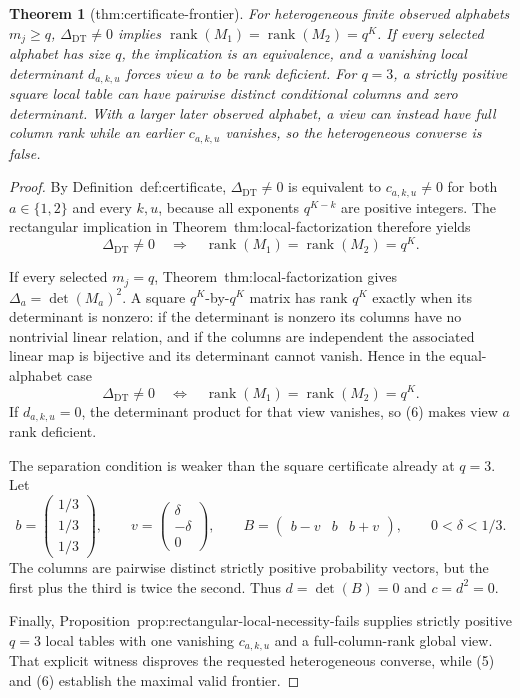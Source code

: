 \documentclass{article}
\newtheorem{theorem}{Theorem}
\begin{document}
\begin{theorem}[thm:certificate-frontier]\label{thm:certificate-frontier}
For heterogeneous finite observed alphabets \(m_j\ge q\), \(\Delta_{\mathrm{DT}}\neq0\) implies \(\operatorname{rank}(M_1)=\operatorname{rank}(M_2)=q^K\).  If every selected alphabet has size \(q\), the implication is an equivalence, and a vanishing local determinant \(d_{a,k,u}\) forces view \(a\) to be rank deficient.  For \(q=3\), a strictly positive square local table can have pairwise distinct conditional columns and zero determinant.  With a larger later observed alphabet, a view can instead have full column rank while an earlier \(c_{a,k,u}\) vanishes, so the heterogeneous converse is false.
\end{theorem}
\begin{proof}
By Definition~\textnormal{def:certificate}, \(\Delta_{\mathrm{DT}}\neq0\) is equivalent to \(c_{a,k,u}\neq0\) for both \(a\in\{1,2\}\) and every \(k,u\), because all exponents \(q^{K-k}\) are positive integers.  The rectangular implication in Theorem~\textnormal{thm:local-factorization} therefore yields
\[
 \Delta_{\mathrm{DT}}\neq0
 \quad\Longrightarrow\quad
 \operatorname{rank}(M_1)=\operatorname{rank}(M_2)=q^K.
\tag{5}
\]

If every selected \(m_j=q\), Theorem~\textnormal{thm:local-factorization} gives \(\Delta_a=\det(M_a)^2\).  A square \(q^K\)-by-\(q^K\) matrix has rank \(q^K\) exactly when its determinant is nonzero: if the determinant is nonzero its columns have no nontrivial linear relation, and if the columns are independent the associated linear map is bijective and its determinant cannot vanish.  Hence in the equal-alphabet case
\[
 \Delta_{\mathrm{DT}}\neq0
 \quad\Longleftrightarrow\quad
 \operatorname{rank}(M_1)=\operatorname{rank}(M_2)=q^K.
\tag{6}
\]
If \(d_{a,k,u}=0\), the determinant product for that view vanishes, so (6) makes view \(a\) rank deficient.

The separation condition is weaker than the square certificate already at \(q=3\).  Let
\[
 b=\begin{pmatrix}1/3\\1/3\\1/3\end{pmatrix},
 \qquad
 v=\begin{pmatrix}\delta\\-\delta\\0\end{pmatrix},
 \qquad
 B=\begin{pmatrix}b-v&b&b+v\end{pmatrix},
 \qquad 0<\delta<1/3.
\]
The columns are pairwise distinct strictly positive probability vectors, but the first plus the third is twice the second.  Thus \(d=\det(B)=0\) and \(c=d^2=0\).

Finally, Proposition~\textnormal{prop:rectangular-local-necessity-fails} supplies strictly positive \(q=3\) local tables with one vanishing \(c_{a,k,u}\) and a full-column-rank global view.  That explicit witness disproves the requested heterogeneous converse, while (5) and (6) establish the maximal valid frontier.
\end{proof}
\end{document}
